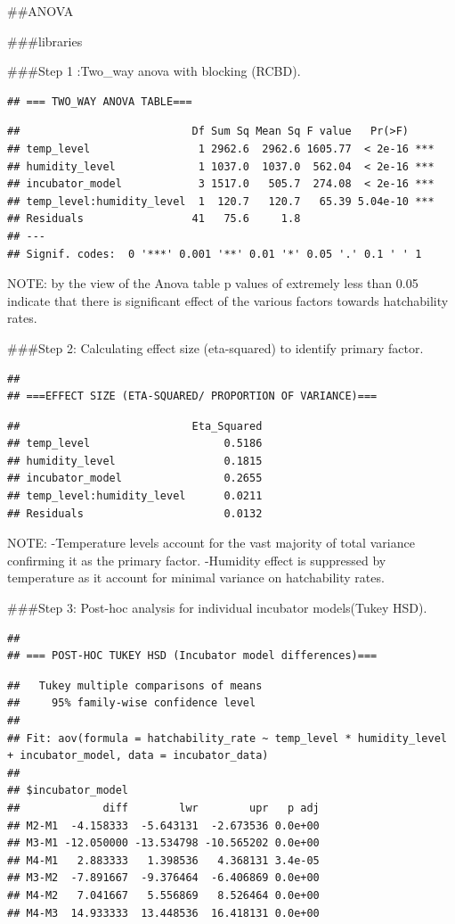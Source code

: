 \documentclass[
]{article}
\begin{document}
\#\#ANOVA

\#\#\#libraries

\#\#\#Step 1 :Two\_way anova with blocking (RCBD).

\begin{verbatim}
## === TWO_WAY ANOVA TABLE===
\end{verbatim}

\begin{verbatim}
##                           Df Sum Sq Mean Sq F value   Pr(>F)    
## temp_level                 1 2962.6  2962.6 1605.77  < 2e-16 ***
## humidity_level             1 1037.0  1037.0  562.04  < 2e-16 ***
## incubator_model            3 1517.0   505.7  274.08  < 2e-16 ***
## temp_level:humidity_level  1  120.7   120.7   65.39 5.04e-10 ***
## Residuals                 41   75.6     1.8                     
## ---
## Signif. codes:  0 '***' 0.001 '**' 0.01 '*' 0.05 '.' 0.1 ' ' 1
\end{verbatim}

NOTE: by the view of the Anova table p values of extremely less than
0.05 indicate that there is significant effect of the various factors
towards hatchability rates.

\#\#\#Step 2: Calculating effect size (eta-squared) to identify primary
factor.

\begin{verbatim}
## 
## ===EFFECT SIZE (ETA-SQUARED/ PROPORTION OF VARIANCE)===
\end{verbatim}

\begin{verbatim}
##                           Eta_Squared
## temp_level                     0.5186
## humidity_level                 0.1815
## incubator_model                0.2655
## temp_level:humidity_level      0.0211
## Residuals                      0.0132
\end{verbatim}

NOTE: -Temperature levels account for the vast majority of total
variance confirming it as the primary factor. -Humidity effect is
suppressed by temperature as it account for minimal variance on
hatchability rates.

\#\#\#Step 3: Post-hoc analysis for individual incubator models(Tukey
HSD).

\begin{verbatim}
## 
## === POST-HOC TUKEY HSD (Incubator model differences)===
\end{verbatim}

\begin{verbatim}
##   Tukey multiple comparisons of means
##     95% family-wise confidence level
## 
## Fit: aov(formula = hatchability_rate ~ temp_level * humidity_level + incubator_model, data = incubator_data)
## 
## $incubator_model
##             diff        lwr        upr   p adj
## M2-M1  -4.158333  -5.643131  -2.673536 0.0e+00
## M3-M1 -12.050000 -13.534798 -10.565202 0.0e+00
## M4-M1   2.883333   1.398536   4.368131 3.4e-05
## M3-M2  -7.891667  -9.376464  -6.406869 0.0e+00
## M4-M2   7.041667   5.556869   8.526464 0.0e+00
## M4-M3  14.933333  13.448536  16.418131 0.0e+00
\end{verbatim}
\end{document}
